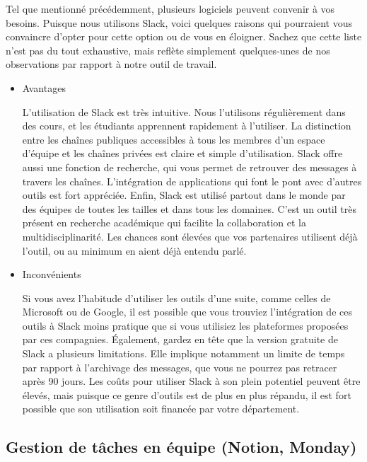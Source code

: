 \documentclass[
  letterpaper,
  DIV=11,
  numbers=noendperiod]{scrreprt}
\begin{document}
Tel que mentionné précédemment, plusieurs logiciels peuvent convenir à
vos besoins. Puisque nous utilisons Slack, voici quelques raisons qui
pourraient vous convaincre d'opter pour cette option ou de vous en
éloigner. Sachez que cette liste n'est pas du tout exhaustive, mais
reflète simplement quelques-unes de nos observations par rapport à notre
outil de travail.

\begin{itemize}
\item
  Avantages

  L'utilisation de Slack est très intuitive. Nous l'utilisons
  régulièrement dans des cours, et les étudiants apprennent rapidement à
  l'utiliser. La distinction entre les chaînes publiques accessibles à
  tous les membres d'un espace d'équipe et les chaînes privées est
  claire et simple d'utilisation. Slack offre aussi une fonction de
  recherche, qui vous permet de retrouver des messages à travers les
  chaînes. L'intégration de applications qui font le pont avec d'autres
  outils est fort appréciée. Enfin, Slack est utilisé partout dans le
  monde par des équipes de toutes les tailles et dans tous les domaines.
  C'est un outil très présent en recherche académique qui facilite la
  collaboration et la multidisciplinarité. Les chances sont élevées que
  vos partenaires utilisent déjà l'outil, ou au minimum en aient déjà
  entendu parlé.
\item
  Inconvénients

  Si vous avez l'habitude d'utiliser les outils d'une suite, comme
  celles de Microsoft ou de Google, il est possible que vous trouviez
  l'intégration de ces outils à Slack moins pratique que si vous
  utilisiez les plateformes proposées par ces compagnies. Également,
  gardez en tête que la version gratuite de Slack a plusieurs
  limitations. Elle implique notamment un limite de temps par rapport à
  l'archivage des messages, que vous ne pourrez pas retracer après 90
  jours. Les coûts pour utiliser Slack à son plein potentiel peuvent
  être élevés, mais puisque ce genre d'outils est de plus en plus
  répandu, il est fort possible que son utilisation soit financée par
  votre département.
\end{itemize}

\subsection{Gestion de tâches en équipe (Notion,
Monday)}\label{gestion-de-tuxe2ches-en-uxe9quipe-notion-monday}
\end{document}
